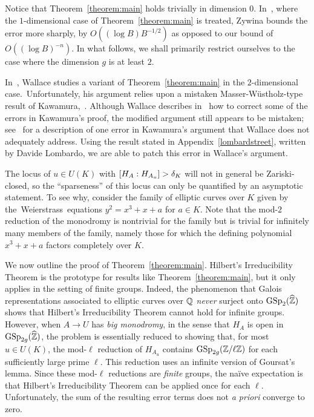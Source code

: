 \begin{remark}\label{remkydoo}
	Notice that Theorem~\ref{theorem:main} holds trivially in dimension $0$. In~\cite[Theorem 1.15]{zywina2010hilbert}, where the $1$-dimensional case of Theorem~\ref{theorem:main} is treated, Zywina bounds the error more sharply, by
$O( (\log B)B^{-1/2} )$ as opposed to our bound of
$O( (\log B)^{-n} )$.
In what follows, we shall primarily restrict ourselves to the case where the dimension $g$ is at least $2$.
\end{remark}

\begin{remark}
In~\cite{scoopdedoo}, Wallace studies a variant of Theorem~\ref{theorem:main} in the $2$-dimensional case.~Unfortunately, his argument relies upon a mistaken Masser-W\"{u}stholz-type result of Kawamura,~\cite[Main Theorem 2]{ifyouseekamy}. Although Wallace describes in~\cite[p.~468]{scoopdedoo} how to correct some of the errors in Kawamura's proof, the modified argument still appears to be mistaken; see~\cite[p.~27]{lombardoGL2type} for a description of one error in Kawamura's argument that Wallace does not adequately address.
Using the result stated in Appendix~\ref{lombardstreet}, written by Davide Lombardo, we are able to patch this error in Wallace's argument.
\end{remark}

\begin{remark}
	\label{remark:}
    The locus of $u \in U(K)$ with $[H_A : H_{A_u}] > \delta_K$ will not in general be Zariski-closed, so the ``sparseness'' of this locus can only be quantified by an asymptotic statement. To see why, consider the family of
	elliptic curves over $K$
	given by \mbox{the Weierstrass equations} $y^2 = x^3 + x + a$ for $a \in K$. Note that the mod-$2$ reduction of the monodromy is nontrivial for the family but is trivial for infinitely many members of the family, namely those for which the defining polynomial $x^3 + x + a$ factors completely over $K$.
\end{remark}

We now outline the proof of Theorem~\ref{theorem:main}. Hilbert's Irreducibility Theorem is the prototype for results like Theorem~\ref{theorem:main}, but it only applies in the setting of finite groups. Indeed, the phenomenon that Galois representations associated to elliptic curves over ${\mathbb Q}$ \emph{never} surject onto $\operatorname{GSp}_2(\widehat{\mathbb Z})$ shows that Hilbert's Irreducibility Theorem cannot hold for infinite groups. However, when $A \to U$ has \emph{big monodromy}, in the sense that $H_A$ is open in $\operatorname{GSp}_{2g}(\widehat{{\mathbb Z}})$, the problem is essentially reduced to showing that, for most $u \in U(K)$, the mod-$\ell$ reduction of $H_{A_u}$ contains $\operatorname{GSp}_{2g}({\mathbb Z} / \ell {\mathbb Z})$ for each sufficiently large prime $\ell$. This reduction uses an infinite version of Goursat's lemma. Since these mod-$\ell$ reductions are \emph{finite} groups, the na\"{i}ve expectation is that Hilbert's Irreducibility Theorem can be applied once for each $\ell$. Unfortunately, the sum of the resulting error terms does not \emph{a priori} converge to zero.

